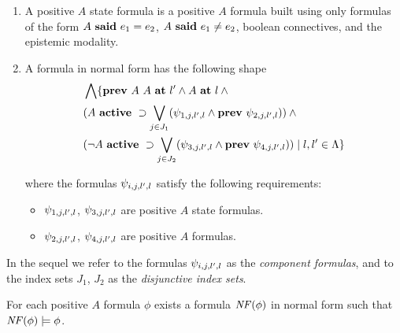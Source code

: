 \begin{definition}
\mbox{}
\begin{enumerate}
\item
A positive $A$ state formula is a positive $A$ formula built using only formulas of the form $A\ \mathbf{said}\ e_1 = e_2$, $A\ \mathbf{said}\ e_1\neq e_2$, boolean
connectives, and the epistemic modality. 
\item A formula in normal form has the following shape 
\begin{eqnarray}
 & \bigwedge\{\mathbf{prev}\ A\ A\ \mathbf{at}\ l' \wedge A\ \mathbf{at}\ l \wedge \mbox{} \nonumber \\
 & (A\ \mathbf{active}\ \supset \bigvee_{j\in J_1}(\psi_{1,j,l',l} \wedge \mathbf{prev}\ \psi_{2,j,l',l})) \wedge \mbox{} \nonumber \\ 
 & (\neg A\ \mathbf{active}\ \supset \bigvee_{j\in J_2}(\psi_{3,j,l',l} \wedge \mathbf{prev}\ \psi_{4,j,l',l})) \mid l,l'\in\Lambda\} \label{160418.0}
\end{eqnarray}

where the formulas $\psi_{i,j,l',l}$ satisfy the following requirements:
\begin{itemize}
\item $\psi_{1,j,l',l}$, $\psi_{3,j,l',l}$ are positive $A$ state formulas.
\item $\psi_{2,j,l',l}$, $\psi_{4,j,l',l}$ are positive $A$ formulas.
\end{itemize}
\end{enumerate}
%
\end{definition}
%
%
In the sequel we refer to the formulas $\psi_{i,j,l',l}$ as the \emph{component formulas}, and to the index sets
$J_1$, $J_2$ as the \emph{disjunctive index sets}. 
%
%
\begin{theorem}
For each positive $A$ formula $\phi$ exists a formula $\mathit{NF}(\phi)$ in normal form such that $\mathit{NF}(\phi) \models \phi$.
\end{theorem} 
